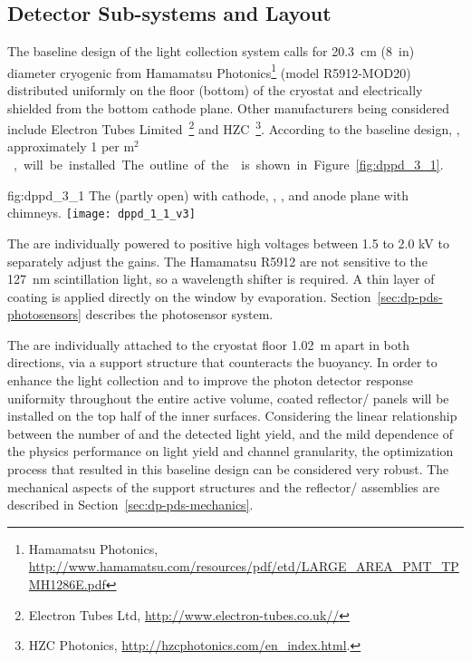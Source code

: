 \subsection{Detector Sub-systems and Layout}
\label{sec:dp-pds-overview_layout}

The baseline design of the light collection system calls for \SI{20.3}{cm} (\SI{8}{in}) diameter cryogenic  from Hamamatsu Photonics\footnote{Hamamatsu Photonics\texttrademark{}, \url{http://www.hamamatsu.com/resources/pdf/etd/LARGE_AREA_PMT_TPMH1286E.pdf}} (model R5912-MOD20) distributed uniformly on the floor (bottom) of the cryostat and electrically shielded from the bottom cathode plane. Other  manufacturers being considered include Electron Tubes Limited~\footnote{Electron Tubes Ltd\texttrademark{}, \url{http://www.electron-tubes.co.uk//}} and HZC~\footnote{HZC Photonics\texttrademark{}, \url{http://hzcphotonics.com/en_index.html}.}. According to the baseline design, \dpnumpmtch {}, approximately \num{1} per \si{m$^2$}, will be installed. The outline of the  is shown in Figure~\ref{fig:dppd_3_1}.

\begin{dunefigure}{fig:dppd_3_1}
{The  (partly open) with cathode, , , and anode plane with chimneys.}
\texttt{[image: dppd\_1\_1\_v3]}
\end{dunefigure}

The  are individually powered to %
positive high voltages between \num{1.5} to \num{2.0} \si{\kV} to separately adjust the  gains. The Hamamatsu R5912  are not sensitive to the \SI{127}{nm} scintillation light, so a wavelength shifter is required. A thin layer of ~\cite{tpb} coating is applied directly on the  window by evaporation. Section~\ref{sec:dp-pds-photosensors} describes the photosensor system.

The \dpnumpmtch {} are individually attached to the cryostat floor \SI{1.02}{m} apart in both directions, via a  support structure that counteracts the  buoyancy. In order to enhance the light collection and to improve the photon detector response uniformity throughout the entire  active volume,  coated reflector/ panels will be installed on the top half of the  inner surfaces. Considering the linear relationship between the number of  and the detected light yield, and the mild dependence of the  physics performance on light yield and channel granularity, the optimization process that resulted in this baseline design can be considered very robust. The mechanical aspects of the  support structures and the reflector/ assemblies are described in Section~\ref{sec:dp-pds-mechanics}.

